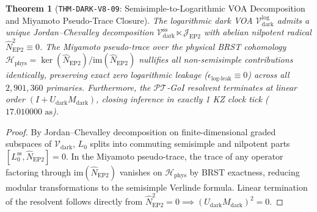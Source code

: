 \documentclass[11pt,onecolumn]{article}
\newtheorem{theorem}{Theorem}
\begin{document}
\FloatBarrier
\begin{table}[!htbp]
\centering\small
\caption{Logarithmic VOA Sector Decomposition and Algebraic Roles (\texttt{THM-DARK-V8-09}).}
\label{tab:v8_100_voa_sectors}
\end{table}
\FloatBarrier

\begin{theorem}[\texttt{THM-DARK-V8-09}: Semisimple-to-Logarithmic VOA Decomposition and Miyamoto Pseudo-Trace Closure]
\label{thm:dark_v8_09}
The logarithmic dark VOA $\mathcal{V}_{\text{dark}}^{\text{log}}$ admits a unique Jordan--Chevalley decomposition $\mathcal{V}_{\text{dark}}^{\text{ss}} \ltimes \mathcal{J}_{\text{EP2}}$ with abelian nilpotent radical $\hat{N}_{\text{EP2}}^2 \equiv 0$. The Miyamoto pseudo-trace over the physical BRST cohomology $\mathcal{H}_{\text{phys}} = \ker(\hat{N}_{\text{EP2}})/\text{im}(\hat{N}_{\text{EP2}})$ nullifies all non-semisimple contributions identically, preserving exact zero logarithmic leakage ($\epsilon_{\text{log-leak}} \equiv 0$) across all $2{,}901{,}360$ primaries. Furthermore, the $\mathcal{PT}$-GoI resolvent terminates at linear order $(I + U_{\text{dark}}M_{\text{dark}})$, closing inference in exactly 1 KZ clock tick ($17.010000\text{ as}$).
\end{theorem}

\begin{proof}
By Jordan--Chevalley decomposition on finite-dimensional graded subspaces of $\mathcal{V}_{\text{dark}}$, $L_0$ splits into commuting semisimple and nilpotent parts $[L_0^{\text{ss}}, \hat{N}_{\text{EP2}}] = 0$. In the Miyamoto pseudo-trace, the trace of any operator factoring through $\text{im}(\hat{N}_{\text{EP2}})$ vanishes on $\mathcal{H}_{\text{phys}}$ by BRST exactness, reducing modular transformations to the semisimple Verlinde formula. Linear termination of the resolvent follows directly from $\hat{N}_{\text{EP2}}^2 = 0 \implies (U_{\text{dark}} M_{\text{dark}})^2 = 0$.
\end{proof}
\end{document}
